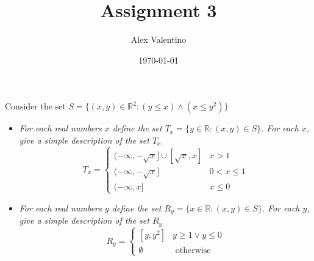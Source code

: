 \documentclass[12pt, letterpaper]{article}
\date{\today}
\author{Alex Valentino}
\title{Assignment 3}
\newcommand{\R}{\mathbb{R}}
\begin{document}
	Consider the set $S = \{(x,y) \in \R^2 : (y \leq x) \wedge (x \leq y^2)\}$\\
	\begin{itemize}
		\item \textit{For each real numbers $x$ define the set $T_x = \{y\in \R : (x,y) \in S\}.$ For each $x$, give a simple description of the set $T_x$}
		\begin{equation}
			T_x =\begin{cases}
				(-\infty,-\sqrt{x}] \cup [\sqrt{x},x] & x>1\\
				(-\infty,-\sqrt{x}] & 0 < x \leq 1\\
				(-\infty, x] & x \leq 0
			\end{cases}
		\end{equation}
		\item \textit{For each real numbers $y$ define the set $R_y = \{x\in \R : (x,y) \in S\}.$ For each $y$, give a simple description of the set $R_y$}
		\begin{equation}
		R_y = \begin{cases}
			[y,y^2] & y \geq 1 \vee y \leq 0\\
			\emptyset & \text{ otherwise}
		\end{cases}
		\end{equation}
	\end{itemize}
\end{document}
